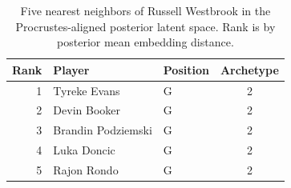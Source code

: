 \begin{table}[htbp]
  \centering\small
  \begin{tabular}{rllc}
    \toprule
    Rank & Player & Position & Archetype \\
    \midrule
    1 & Tyreke Evans & G & 2 \\
    2 & Devin Booker & G & 2 \\
    3 & Brandin Podziemski & G & 2 \\
    4 & Luka Doncic & G & 2 \\
    5 & Rajon Rondo & G & 2 \\
    \bottomrule
  \end{tabular}
  \caption{Five nearest neighbors of Russell Westbrook in the Procrustes-aligned posterior latent space. Rank is by posterior mean embedding distance.}
  \label{tab:Russell_Westbrook_neighbors}
\end{table}

